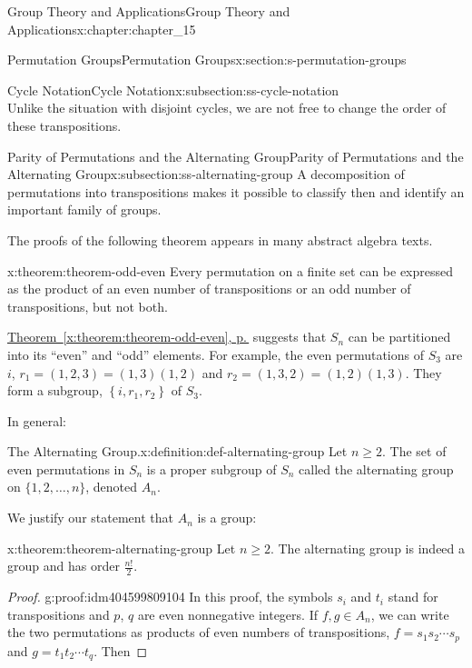 \documentclass[twoside,10pt,]{book}
\newcommand{\xreffont}{\relax}
\numberwithin{equation}{section}
\begin{document}
\begin{chapterptx}{Group Theory and Applications}{}{Group Theory and Applications}{}{}{x:chapter:chapter_15}
\begin{sectionptx}{Permutation Groups}{}{Permutation Groups}{}{}{x:section:s-permutation-groups}
\begin{subsectionptx}{Cycle Notation}{}{Cycle Notation}{}{}{x:subsection:ss-cycle-notation}
\begin{equation*}
\end{equation*}
Unlike the situation with disjoint cycles, we are not free to change the order of these transpositions.%
\end{subsectionptx}
%
%
\typeout{************************************************}
\typeout{************************************************}
%
\begin{subsectionptx}{Parity of Permutations and the Alternating Group}{}{Parity of Permutations and the Alternating Group}{}{}{x:subsection:ss-alternating-group}
A decomposition of permutations into transpositions makes it possible to classify then and identify an important family of groups.%
\par
The proofs of the following  theorem appears in many abstract algebra texts.%
\begin{theorem}{}{}{x:theorem:theorem-odd-even}%
Every permutation on a finite set can be expressed as the product of an even number of transpositions or an odd number of transpositions, but not both.%
\end{theorem}
\hyperref[x:theorem:theorem-odd-even]{Theorem~{\xreffont\ref{x:theorem:theorem-odd-even}}, p.\,\pageref{x:theorem:theorem-odd-even}} suggests that \(S_n\) can be partitioned into its ``even'' and ``odd'' elements. For example, the even permutations of \(S_3\) are \(i\), \(r_1=(1,2,3)=(1,3)(1,2)\) and \(r_2=(1,3,2)=(1,2)(1,3)\).  They form a subgroup, \(\left\{i,r_1,r_2\right\}\) of  \(S_3\).%
\par
In general:%
\begin{definition}{The Alternating Group.}{x:definition:def-alternating-group}%
%
\label{g:notation:idm404599813456}%
Let \(n \geq 2\). The set of even permutations in \(S_n\) is a proper subgroup of \(S_n\) called the alternating group on \(\{1, 2, \ldots, n\}\), denoted \(A_n\).%
\end{definition}
We justify our statement that \(A_n\) is a group:%
\begin{theorem}{}{}{x:theorem:theorem-alternating-group}%
Let \(n \geq 2\). The alternating group is indeed a group and has order \(\frac{n!}{2}\).%
\end{theorem}
\begin{proof}{}{g:proof:idm404599809104}
In this proof, the symbols \(s_i\) and \(t_i\) stand for transpositions and \(p\), \(q\) are even  nonnegative integers. If  \(f, g \in A_n\),  we can write the two permutations as products of even numbers of transpositions, \(f=s_1s_2\cdots  s_p\) and \(g=t_1t_2\cdots  t_q\).  Then%

\end{proof}
\end{subsectionptx}
\end{sectionptx}
\end{chapterptx}
\end{document}
